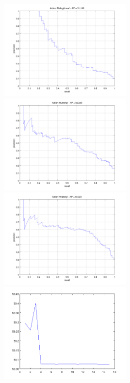 \documentclass[10pt,a4paper]{llncs}
\begin{document}
\begin{figure}
\begin{minipage}{0.5\linewidth}
\end{minipage}
\begin{minipage}{0.5\linewidth}
\includegraphics[height=5cm]{img/SVM_PYR_PR_RidingHorse.png}
\end{minipage}
\begin{minipage}{0.5\linewidth}
\includegraphics[height=5cm]{img/SVM_PYR_PR_Running.png}
\end{minipage}
\begin{minipage}{0.5\linewidth}
\includegraphics[height=5cm]{img/SVM_PYR_PR_Walking.png}
\end{minipage}
\begin{minipage}{0.5\linewidth}
\includegraphics[height=5cm]{img/SVM_PYR_CV.png}
\end{minipage}
\end{figure}
\end{document}
